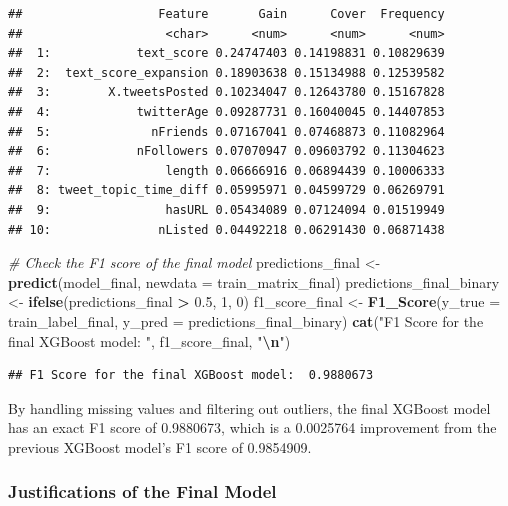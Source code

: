 \documentclass[
]{article}
\newenvironment{Shaded}{\begin{snugshade}}{\end{snugshade}}
\newcommand{\AttributeTok}[1]{\textcolor[rgb]{0.13,0.29,0.53}{#1}}
\newcommand{\CommentTok}[1]{\textcolor[rgb]{0.56,0.35,0.01}{\textit{#1}}}
\newcommand{\DecValTok}[1]{\textcolor[rgb]{0.00,0.00,0.81}{#1}}
\newcommand{\FloatTok}[1]{\textcolor[rgb]{0.00,0.00,0.81}{#1}}
\newcommand{\FunctionTok}[1]{\textcolor[rgb]{0.13,0.29,0.53}{\textbf{#1}}}
\newcommand{\NormalTok}[1]{#1}
\newcommand{\OtherTok}[1]{\textcolor[rgb]{0.56,0.35,0.01}{#1}}
\newcommand{\SpecialCharTok}[1]{\textcolor[rgb]{0.81,0.36,0.00}{\textbf{#1}}}
\newcommand{\StringTok}[1]{\textcolor[rgb]{0.31,0.60,0.02}{#1}}
\begin{document}
\begin{verbatim}
##                   Feature       Gain      Cover  Frequency
##                    <char>      <num>      <num>      <num>
##  1:            text_score 0.24747403 0.14198831 0.10829639
##  2:  text_score_expansion 0.18903638 0.15134988 0.12539582
##  3:        X.tweetsPosted 0.10234047 0.12643780 0.15167828
##  4:            twitterAge 0.09287731 0.16040045 0.14407853
##  5:              nFriends 0.07167041 0.07468873 0.11082964
##  6:            nFollowers 0.07070947 0.09603792 0.11304623
##  7:                length 0.06666916 0.06894439 0.10006333
##  8: tweet_topic_time_diff 0.05995971 0.04599729 0.06269791
##  9:                hasURL 0.05434089 0.07124094 0.01519949
## 10:               nListed 0.04492218 0.06291430 0.06871438
\end{verbatim}

\begin{Shaded}
\begin{Highlighting}[]
\CommentTok{\# Check the F1 score of the final model}
\NormalTok{predictions\_final }\OtherTok{\textless{}{-}} \FunctionTok{predict}\NormalTok{(model\_final, }\AttributeTok{newdata =}\NormalTok{ train\_matrix\_final)}
\NormalTok{predictions\_final\_binary }\OtherTok{\textless{}{-}} \FunctionTok{ifelse}\NormalTok{(predictions\_final }\SpecialCharTok{\textgreater{}} \FloatTok{0.5}\NormalTok{, }\DecValTok{1}\NormalTok{, }\DecValTok{0}\NormalTok{)}
\NormalTok{f1\_score\_final }\OtherTok{\textless{}{-}} \FunctionTok{F1\_Score}\NormalTok{(}\AttributeTok{y\_true =}\NormalTok{ train\_label\_final, }\AttributeTok{y\_pred =}\NormalTok{ predictions\_final\_binary)}
\FunctionTok{cat}\NormalTok{(}\StringTok{"F1 Score for the final XGBoost model: "}\NormalTok{, f1\_score\_final, }\StringTok{"}\SpecialCharTok{\textbackslash{}n}\StringTok{"}\NormalTok{)}
\end{Highlighting}
\end{Shaded}

\begin{verbatim}
## F1 Score for the final XGBoost model:  0.9880673
\end{verbatim}

By handling missing values and filtering out outliers, the final XGBoost
model has an exact F1 score of 0.9880673, which is a 0.0025764
improvement from the previous XGBoost model's F1 score of 0.9854909.

\subsubsection{Justifications of the Final
Model}\label{justifications-of-the-final-model}
\end{document}
